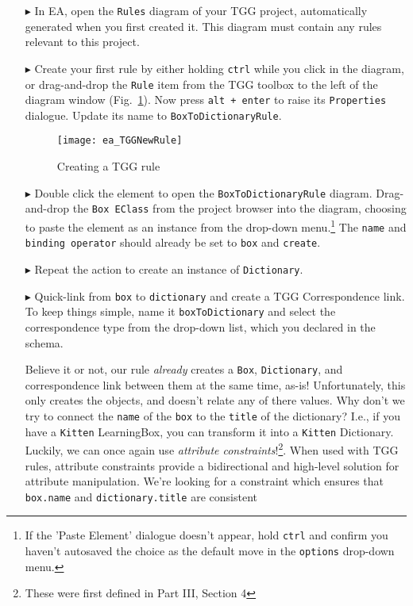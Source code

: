 \begin{enumerate}
\item[$\blacktriangleright$] In EA, open the \texttt{Rules} diagram of your TGG project, automatically generated when you first created it. This diagram must
contain any rules relevant to this project.

\item[$\blacktriangleright$] Create your first rule by either holding \texttt{ctrl} while you click in the diagram, or drag-and-drop the \texttt{Rule} item from
the TGG toolbox to the left of the diagram window (Fig.~\ref{fig:create_tgg_rule}). Now press \texttt{alt + enter} to raise its \texttt{Properties} dialogue.
Update its name to \texttt{BoxToDictionaryRule}.

\vspace{0.5cm}

\begin{figure}[htbp]
\begin{center}
  \texttt{[image: ea\_TGGNewRule]}
  \caption{Creating a TGG rule}
  \label{fig:create_tgg_rule}
\end{center}
\end{figure}

\item[$\blacktriangleright$] Double click the element to open the \texttt{BoxToDictionaryRule} diagram. Drag-and-drop the \texttt{Box EClass} from the project
browser into the diagram, choosing to paste the element as an instance from the drop-down menu.\footnote{If the 'Paste Element' dialogue doesn't appear, hold
\texttt{ctrl} and confirm you haven't autosaved the choice as the default move in the \texttt{options} drop-down menu.} The \texttt{name} and \texttt{binding
operator} should already be set to \texttt{box} and \texttt{create}.

\item[$\blacktriangleright$] Repeat the action to create an instance of \texttt{Dictionary}.

\item[$\blacktriangleright$] Quick-link from \texttt{box} to \texttt{dictionary} and create a TGG Correspondence link. To keep things simple, name it
\texttt{boxToDictionary} and select the correspondence type from the drop-down list, which you declared in the schema.

Believe it or not, our rule \emph{already} creates a \texttt{Box}, \texttt{Dictionary}, and correspondence link between them at the same time, as-is!
Unfortunately, this only creates the objects, and doesn't relate any of there values. Why don't we try to connect the \texttt{name} of the \texttt{box} to the \texttt{title}
of the dictionary? I.e., if you have a \texttt{Kitten} LearningBox, you can transform it into a \texttt{Kitten} Dictionary. Luckily, we can once again use
\emph{attribute constraints}!\footnote{These were first defined in Part III, Section 4}. When used with TGG rules, attribute constraints provide a bidirectional
and high-level solution for attribute manipulation. We're looking for a constraint which ensures that \texttt{box.name} and \texttt{dictionary.title} are
consistent


\end{enumerate}
